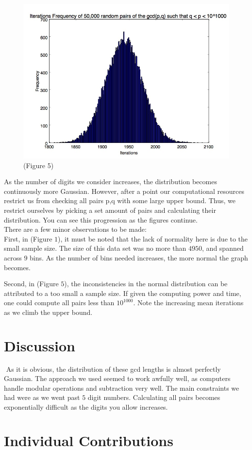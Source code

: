 \documentclass[11pt]{article}
\begin{document}
	\begin{figure}
		\centering

		\includegraphics[scale=.45]{1000_digit_numbers.jpg}
		\center \tiny(Figure 5)
		
	\end{figure}
	\newpage
	As the number of digits we consider increases, the distribution	 becomes continuously more Gaussian. However, after a point our computational resources restrict us from checking all pairs p,q with some large upper bound. Thus, we restrict ourselves by picking a set amount of pairs and calculating their distribution. You can see this progression as the figures continue.\\
	
	There are a few minor observations to be made:\\
	
	 First, in (Figure $1$), it must be noted that the lack of normality here is due to the small sample size. The size of this data set was no more than $4950$, and spanned across $9$ bins. As the number of bins needed increases, the more normal the graph becomes. 
	
	 Second, in (Figure $5$), the inconsistencies in the normal distribution can be attributed to a too small a sample size. If given the computing power and time, one could compute all pairs less than $10^{1000}$. Note the increasing mean iterations as we climb the upper bound.
\section{Discussion}$ $
As it is obvious, the distribution of these gcd lengths is almost perfectly Gaussian. The approach we used seemed to work awfully well, as computers handle modular operations and subtraction very well. The main constraints we had were as we went past $5$ digit numbers. Calculating all pairs becomes exponentially difficult as the digits you allow increases. 



\section{Individual Contributions}$ $
\end{document}
